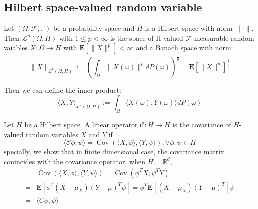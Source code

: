 \begin{theorem}
\subsection{Hilbert space-valued random variable}
\begin{definition}
    Let $(\Omega, \mathcal{F}, \mathbb{P})$ be a probability space and $H$ is a Hilbert space with norm $\|\cdot\|$. Then $\mathcal{L}^p(\Omega, H)$ with $1\leq p<\infty$ is the space
    of H-valued $\mathcal{F}$-measurable random vaiables $X:\Omega\rightarrow H$ with $\mathbf{E}[\|X\|^p]<\infty$ and a Banach space with norm:
    \begin{equation}
        \|X\|_{\mathcal{L}^p(\Omega, H)}:=\left(\int_\Omega \|X(\omega)\|^pdP(\omega)\right)^{\frac{1}{p}}=\mathbf{E}[\|X\|^p]^{\frac{1}{p}}
    \end{equation}
\end{definition}
Then we can define the inner product: 
\begin{equation}
    \langle X, Y\rangle_{\mathcal{L}^2(\Omega, H)}:=\int_\Omega \langle X(\omega), Y(\omega)\rangle dP(\omega)
\end{equation}
\begin{definition}
    Let $H$ be a Hilbert space. A linear operator $\mathcal{C}:H\rightarrow H$ is the covariance of $H$-valued random variables $X$ and $Y$ if 
    \begin{equation}
        \langle\mathcal{C}\phi, \psi\rangle = \operatorname{Cov}\left(\langle X, \phi\rangle, \langle Y, \psi\rangle\right), \forall \phi, \psi \in H
    \end{equation}
    specially, we show that in finite dimensional case, the covariance matrix conincides with the covariance operator. 
    when $H = \mathbb{R}^d$,
    \begin{equation}
        \begin{aligned}
            &\operatorname{Cov}\left(\langle X, \phi\rangle, \langle Y, \psi\rangle\right) 
            = \operatorname{Cov}\left(\phi^T X, \psi^T Y\right)\\
            =&\mathbf{E}\left[\phi^T(X-\mu_X)(Y-\mu)^T\psi\right] 
            = \phi^T\mathbf{E}\left[(X-\mu_X)(Y-\mu)^T\right]\psi\\
            =&\langle C\phi, \psi\rangle
        \end{aligned}
    \end{equation}
\end{definition}


\end{theorem}
